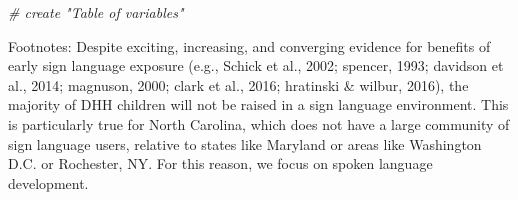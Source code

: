 \documentclass[
]{article}
\newenvironment{Shaded}{\begin{snugshade}}{\end{snugshade}}
\newcommand{\CommentTok}[1]{\textcolor[rgb]{0.56,0.35,0.01}{\textit{#1}}}
\begin{document}
\begin{Shaded}
\begin{Highlighting}[]
\CommentTok{# create "Table of variables"}
\end{Highlighting}
\end{Shaded}

Footnotes: Despite exciting, increasing, and converging evidence for
benefits of early sign language exposure (e.g., Schick et al., 2002;
spencer, 1993; davidson et al., 2014; magnuson, 2000; clark et al.,
2016; hratinski \& wilbur, 2016), the majority of DHH children will not
be raised in a sign language environment. This is particularly true for
North Carolina, which does not have a large community of sign language
users, relative to states like Maryland or areas like Washington D.C. or
Rochester, NY. For this reason, we focus on spoken language development.
\end{document}
